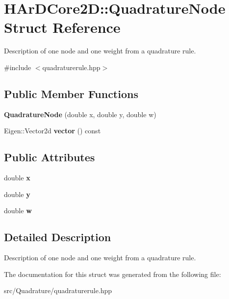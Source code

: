 \hypertarget{structHArDCore2D_1_1QuadratureNode}{}\section{H\+Ar\+D\+Core2D\+:\+:Quadrature\+Node Struct Reference}
\label{structHArDCore2D_1_1QuadratureNode}


Description of one node and one weight from a quadrature rule.  




{\ttfamily \#include $<$quadraturerule.\+hpp$>$}

\subsection*{Public Member Functions}
\begin{DoxyCompactItemize}
\item 
{\bfseries Quadrature\+Node} (double x, double y, double w)
\item 
Eigen\+::\+Vector2d {\bfseries vector} () const
\end{DoxyCompactItemize}
\subsection*{Public Attributes}
\begin{DoxyCompactItemize}
\item 
double {\bfseries x}
\item 
double {\bfseries y}
\item 
double {\bfseries w}
\end{DoxyCompactItemize}


\subsection{Detailed Description}
Description of one node and one weight from a quadrature rule. 

The documentation for this struct was generated from the following file\+:\begin{DoxyCompactItemize}
\item 
src/\+Quadrature/quadraturerule.\+hpp\end{DoxyCompactItemize}
